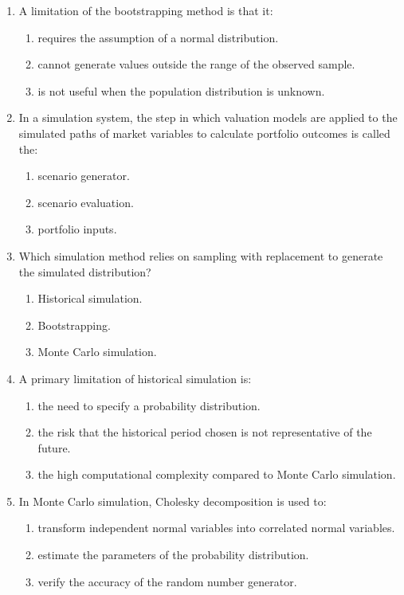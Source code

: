 \begin{enumerate}
	\item A limitation of the bootstrapping method is that it:
	      \begin{enumerate}[label=\Alph*.]
		      \item requires the assumption of a normal distribution.
		      \item cannot generate values outside the range of the observed sample.
		      \item is not useful when the population distribution is unknown.
	      \end{enumerate}

	\item In a simulation system, the step in which valuation models are applied to the simulated paths of market variables to calculate portfolio outcomes is called the:
	      \begin{enumerate}[label=\Alph*.]
		      \item scenario generator.
		      \item scenario evaluation.
		      \item portfolio inputs.
	      \end{enumerate}

	\item Which simulation method relies on sampling with replacement to generate the simulated distribution?
	      \begin{enumerate}[label=\Alph*.]
		      \item Historical simulation.
		      \item Bootstrapping.
		      \item Monte Carlo simulation.
	      \end{enumerate}

	\item A primary limitation of historical simulation is:
	      \begin{enumerate}[label=\Alph*.]
		      \item the need to specify a probability distribution.
		      \item the risk that the historical period chosen is not representative of the future.
		      \item the high computational complexity compared to Monte Carlo simulation.
	      \end{enumerate}

	\item In Monte Carlo simulation, Cholesky decomposition is used to:
	      \begin{enumerate}[label=\Alph*.]
		      \item transform independent normal variables into correlated normal variables.
		      \item estimate the parameters of the probability distribution.
		      \item verify the accuracy of the random number generator.
	      \end{enumerate}


\end{enumerate}

